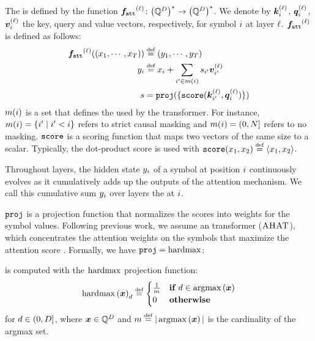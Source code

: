 \documentclass{article}
\begin{document}
The  is defined by the function $\attnfunc^{(\layerIdx)} \colon \kleene{\mleft(\Q^\hiddDim\mright)} \to \kleene{\mleft(\Q^\hiddDim\mright)}$. We denote by ${{{ \bm{k}}}}_{{{ i}}}^{({\ell})}$, ${{{ \bm{q}}}}_{{{ i}}}^{({\ell})}$, ${{{ \bm{v}}}}_{{{ i}}}^{({\ell})}$ the key, query and value vectors, respectively, for symbol ${{ i}}$ at layer ${\ell}$. 
${{{ \boldsymbol{f}}}_\texttt{att}}^{({\ell})}$ is defined as follows: 
\begin{subequations}
    \begin{align}
        \attnfunc^{(\layerIdx)}((\evx_1, \cdots, \evx_{\strlen})) & \defeq (\evy_1, \cdots, \evy_{\strlen}) \\
        \evy_\idxi & \defeq \evx_\idxi + \sum_{\idxi' \in \maskFun{\idxi}} \evs_{\idxi'} \vv_{\idxi'}^{(\layerIdx)} \\ 
        \evs & = \proj(\set{\scorefunc(\vk_{\idxi'}^{(\layerIdx)}, \vq_{\idxi}^{(\layerIdx)})})
    \end{align}
\end{subequations}
$\maskFun{\idxi}$ is a set that defines the  used by the transformer. 
For instance, $\maskFun{\idxi} = \set{\idxi' \mid \idxi' < \idxi}$ refers to strict causal masking and $\maskFun{\idxi} = (0,\idxn]$ refers to no masking. 
${{{\texttt{score}}}}$ is a scoring function that maps two vectors of the same size to a scalar. 
Typically, the dot-product score is used with $\scorefunc(\evx_1, \evx_2) \defeq \langle \evx_1, \evx_2 \rangle$. 

Throughout layers, the hidden state ${{{ y}}}_{{ i}}$ of a symbol at position ${{ i}}$ continuously evolves as it cumulatively adds up the outputs of the attention mechanism. We call this cumulative sum ${{{ y}}}_{{ i}}$ over layers the  at ${{ i}}$.

${{\texttt{proj}}}$ is a projection function that normalizes the scores into weights for the symbol values.
Following previous work, we assume an  transformer (${{\textsc{AHAT}}}$), which concentrates the attention weights on the symbols that maximize the attention score \citep{merrill-etal-2022-saturated, strobl2023averagehardattentiontransformersconstantdepth}.
Formally, we have ${{\texttt{proj}}} = {{\mathrm{hardmax}}}$:
\begin{definition}  \label{def:hard-attention}
     is computed with the ${{\mathrm{hardmax}}}$ projection function:
    \begin{equation}
        \hardmaxAvg\left(\vx\right)_\idxd \defeq \begin{cases}
            \frac{1}{m} &\ifcondition \idxd\in \argmax\left(\vx\right) \\
            0 &\otherwisecondition
        \end{cases}
    \end{equation}
    for ${{ d}} \in (0,{{ D}}]$, where ${{{ \bm{x}}}} \in {{ \mathbb{Q}}}^{{ D}}$ and $m \defeq |\argmax\left(\vx\right)|$ is the cardinality of the argmax set.
\end{definition}
\end{document}
